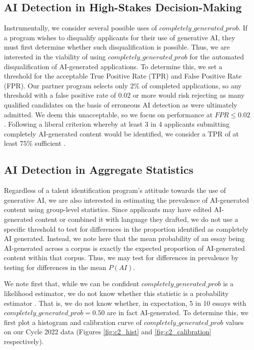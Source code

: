 \subsection{AI Detection in High-Stakes Decision-Making}\label{ssec:exp_accuracy}
Instrumentally, we consider several possible uses of $completely\_generated\_prob$. If a program wishes to disqualify applicants for their use of generative AI, they must first determine whether such disqualification is possible. Thus, we are interested in the viability of using $completely\_generated\_prob$ for the automated disqualification of AI-generated applications. To determine this, we set a threshold for the acceptable True Positive Rate (TPR) and False Positive Rate (FPR). Our partner program selects only $2\%$ of completed applications, so any threshold with a false positive rate of $0.02$ or more would risk rejecting as many qualified candidates on the basis of erroneous AI detection as were ultimately admitted. We deem this unacceptable, so we focus on performance at $FPR \leq 0.02$. Following a liberal criterion whereby at least 3 in 4 applicants submitting completely AI-generated content would be identified, we consider a TPR of at least $75\%$ sufficient \cite{bradley_robustness_1978}.

\subsection{AI Detection in Aggregate Statistics}\label{ssec:exp_statistics}
Regardless of a talent identification program's attitude towards the use of generative AI, we are also interested in estimating the prevalence of AI-generated content using group-level statistics. Since applicants may have edited AI-generated content or combined it with language they drafted, we do not use a specific threshold to test for differences in the proportion identified as completely AI generated. Instead, we note here that the mean probability of an essay being AI-generated across a corpus is exactly the expected proportion of AI-generated content within that corpus. Thus, we may test for differences in prevalence by testing for differences in the mean $P(AI)$. 

We note first that, while we can be confident $completely\_generated\_prob$ is a likelihood estimator, we do not know whether this statistic is a probability estimator \cite{gptzero_gptzero_2023,platt_probabilistic_2000}. That is, we do not know whether, in expectation, 5 in 10 essays with $completely\_generated\_prob = 0.50$ are in fact AI-generated. To determine this, we first plot a histogram and calibration curve of $completely\_generated\_prob$ values on our Cycle 2022 data (Figures \ref{fig:c2_hist} and \ref{fig:c2_calibration} respectively).

